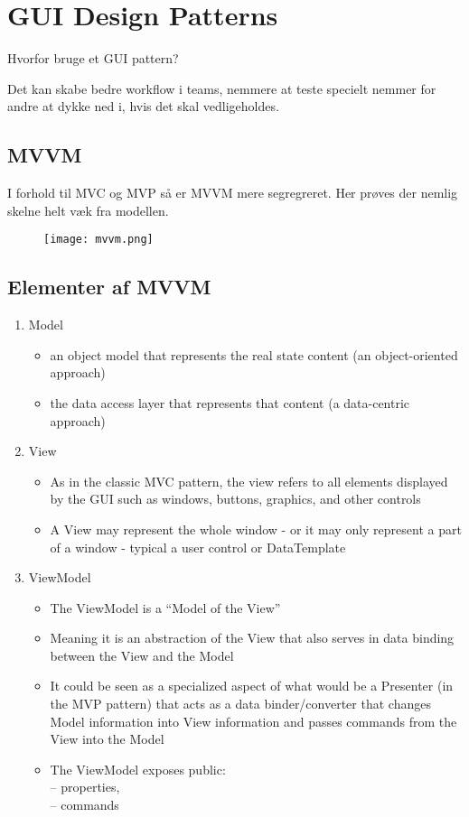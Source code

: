 \documentclass[../SWD_disp.tex]{subfiles}
\begin{document}
\section{GUI Design Patterns}
Hvorfor bruge et GUI pattern?

Det kan skabe bedre workflow i teams, nemmere at teste specielt nemmer for andre at dykke ned i, hvis det skal vedligeholdes.


\subsection{MVVM}
I forhold til MVC og MVP så er MVVM mere segregreret. Her prøves der nemlig skelne helt væk fra modellen.

\begin{figure}[H]
	\centering
	\texttt{[image: mvvm.png]}
\end{figure}
\subsection{Elementer af MVVM}
\begin{enumerate}
	\item Model 
	\begin{itemize}
	\item an object model that represents the real
state content (an object-oriented
approach)
\item  the data access layer that represents that
content (a data-centric approach)
	\end{itemize}
	\item View 
	\begin{itemize}
		\item As in the classic MVC pattern, the view
refers to all elements displayed by the GUI
such as windows, buttons, graphics, and
other controls
\item A View may represent the whole window -
or it may only represent a part of a window
- typical a user control or DataTemplate
	\end{itemize}
	\item ViewModel
	\begin{itemize}
	\item The ViewModel is a “Model of the View”
\item  Meaning it is an abstraction of the View that also
serves in data binding between the View and the
Model
\item  It could be seen as a specialized aspect of what
would be a Presenter (in the MVP pattern) that
acts as a data binder/converter that changes
Model information into View information and
passes commands from the View into the Model
\item  The ViewModel exposes public:\\
– properties,\\
– commands
	\end{itemize}
\end{enumerate}
\end{document}
